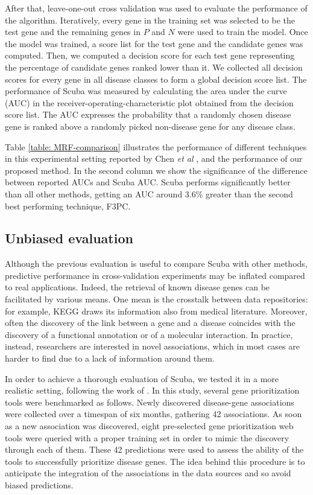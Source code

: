 After that, leave-one-out cross validation was used to evaluate the performance of the algorithm. Iteratively, every gene in the training set was selected to be the test gene and the remaining genes in $P$ and $N$ were used to train the model. Once the model was trained, a score list for the test gene and the candidate genes was computed. Then, we computed a decision score for each test gene representing the percentage of candidate genes ranked lower than it. We collected all decision scores for every gene in all disease classes to form a global decision score list. The performance of Scuba was measured by calculating the area under the curve (AUC) in the receiver-operating-characteristic plot obtained from the decision score list. The AUC expresses the probability that a randomly chosen disease gene is ranked above a randomly picked non-disease gene for any disease class.

Table \ref{table: MRF-comparison} illustrates the performance of different techniques in this experimental setting reported by Chen \emph{et al} \cite{f3pc}, and the performance of our proposed method. In the second column we show the significance of the difference between reported AUCs and Scuba AUC\cite{hanley}. Scuba performs significantly better than all other methods, getting an AUC around 3.6\% greater than the second best performing technique, F3PC.

\subsection*{Unbiased evaluation}\label{unbiased}
Although the previous evaluation is useful to compare Scuba with other methods, predictive performance in cross-validation experiments may be inflated compared to real applications. Indeed, the retrieval of known disease genes can be facilitated by various means. One mean is the crosstalk between data repositories: for example, KEGG \cite{kegg} draws its information also from medical literature. Moreover, often the discovery of the link between a gene and a disease coincides with the discovery of a functional annotation or of a molecular interaction. In practice, instead, researchers are interested in novel associations, which in most cases are harder to find due to a lack of information around them.

In order to achieve a thorough evaluation of Scuba, we tested it in a more realistic setting, following the work of \cite{bornigen}. In this study, several gene prioritization tools were benchmarked as follows. Newly discovered disease-gene associations were collected over a timespan of six months, gathering 42 associations. As soon as a new association was discovered, eight pre-selected gene prioritization web tools were queried with a proper training set in order to mimic the discovery through each of them. These 42 predictions were used to assess the ability of the tools to successfully prioritize disease genes. The idea behind this procedure is to anticipate the integration of the associations in the data sources and so avoid biased predictions.

